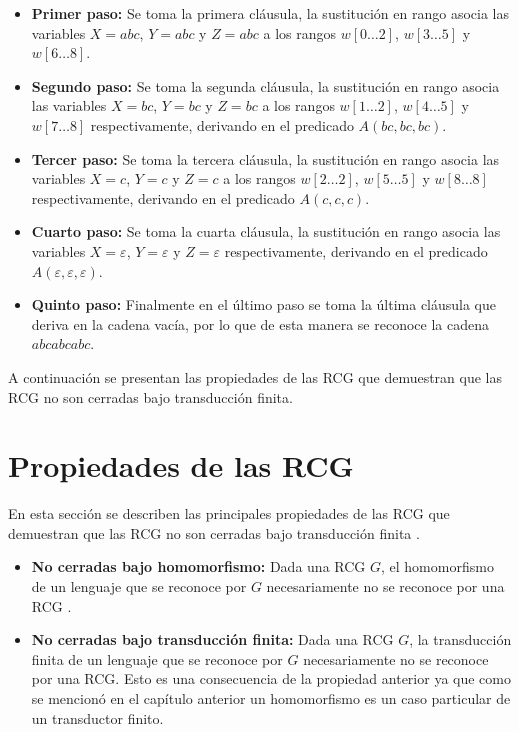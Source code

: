 \documentclass[12pt]{article}
\begin{document}
\begin{itemize}
    \item \textbf{Primer paso:} Se toma la primera cláusula, la sustitución en rango asocia las variables
          $X=abc$, $Y=abc$ y $Z=abc$ a los rangos $w[0\dots 2]$, $w[3\dots 5]$ y $w[6\dots 8]$.
    \item \textbf{Segundo paso:} Se toma la segunda cláusula, la sustitución en rango asocia las variables $X=bc$, $Y=bc$ y $Z=bc$ a los rangos $w[1\dots 2]$,
          $w[4\dots 5]$ y $w[7\dots 8]$ respectivamente, derivando en el predicado $A(bc,bc,bc)$.
    \item \textbf{Tercer paso:} Se toma la tercera cláusula, la sustitución en rango asocia las variables $X=c$, $Y=c$ y $Z=c$ a los
          rangos $w[2\dots 2]$, $w[5\dots 5]$ y $w[8\dots 8]$ respectivamente, derivando en el predicado $A(c,c,c)$.
    \item \textbf{Cuarto paso:} Se toma la cuarta cláusula, la sustitución en rango asocia las variables
          $X=\varepsilon$, $Y=\varepsilon$ y $Z=\varepsilon$ respectivamente, derivando en el predicado
          $A(\varepsilon,\varepsilon,\varepsilon)$.
    \item \textbf{Quinto paso:} Finalmente en el último paso se toma la última
          cláusula que deriva en la cadena vacía, por lo que de esta manera se reconoce la cadena $abcabcabc$.
\end{itemize}

A continuación se presentan las propiedades de las RCG que demuestran que las RCG no son cerradas
bajo transducción finita.

\section{Propiedades de las RCG}

En esta sección se describen las principales propiedades de las RCG que demuestran que las RCG no 
son cerradas bajo transducción finita \cite{propertiesRCGBib}.

\begin{itemize}
    \item  \textbf{No cerradas bajo homomorfismo:} Dada una RCG $G$, el homomorfismo de un lenguaje que se reconoce por $G$ necesariamente no se reconoce por una RCG \cite{propertiesRCGBib}.
    \item \textbf{No cerradas bajo transducción finita:} Dada una RCG $G$, la transducción finita de un lenguaje que se reconoce por $G$ necesariamente no se reconoce por una RCG.  Esto es una consecuencia de la propiedad anterior ya que como se mencionó en el capítulo anterior un homomorfismo es un caso particular de un transductor finito.
\end{itemize}
\end{document}
